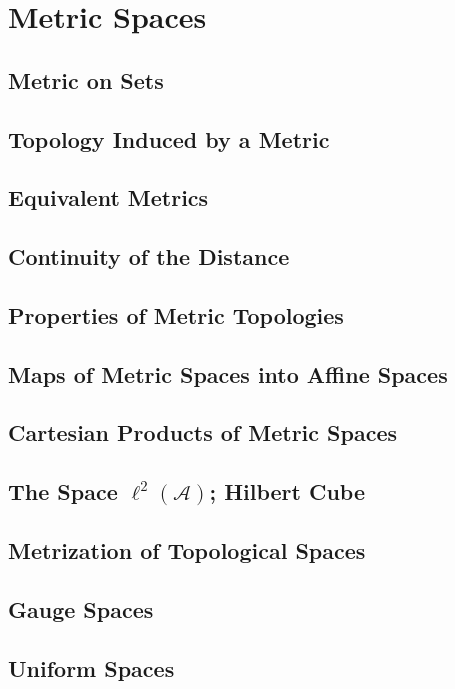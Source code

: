 \chapter{Metric Spaces}

\section{Metric on Sets}

\section{Topology Induced by a Metric}

\section{Equivalent Metrics}

\section{Continuity of the Distance}

\section{Properties of Metric Topologies}

\section{Maps of Metric Spaces into Affine Spaces}

\section{Cartesian Products of Metric Spaces}

\section{The Space \( \ell^{2}(\mathscr{A}) \); Hilbert Cube}

\section{Metrization of Topological Spaces}

\section{Gauge Spaces}

\section{Uniform Spaces}
